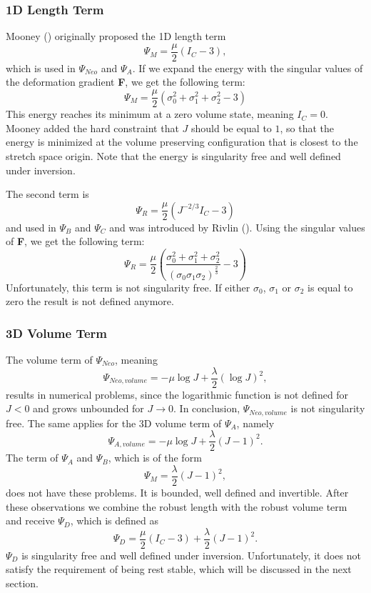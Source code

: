 \subsubsection{1D Length Term}
Mooney (\cite{mooney1940theory}) originally proposed the 1D length term 
\[
\Psi_{M}=\frac{\mu}{2}\left(I_{C}-3\right),
\]
which is used in $\Psi_{Neo}$ and $\Psi_{A}$. If we expand the energy with the singular values of the deformation gradient \textbf{F}, we get the following term:
\[
\Psi_{M}=\frac{\mu}{2}\left(\sigma_{0}^2 + \sigma_{1}^2 + \sigma_{2}^2 - 3\right)
\]
This energy reaches its minimum at a zero volume state, meaning $I_{C}=0$. Mooney added the hard constraint that $J$ should be equal to $1$, so that the energy is minimized at the volume preserving configuration that is closest to the stretch space origin. Note that the energy is singularity free and well defined under inversion.

The second term is
\[
\Psi_{R} = \frac{\mu}{2}\left(J^{-2 / 3} I_{C}-3\right)
\]
and used in $\Psi_{B}$ and $\Psi_{C}$ and was introduced by Rivlin (\cite{rivlin1948large}). Using the singular values of \textbf{F}, we get the following term:
\[
\Psi_{R} = \frac{\mu}{2}\left(\frac{\sigma_{0}^2 + \sigma_{1}^2 + \sigma_{2}^2}{(\sigma_{0}  \sigma_{1}  \sigma_{2})^\frac{2}{3}}
 - 3\right)
\]
Unfortunately, this term is not singularity free. If either $\sigma_{0}$, $\sigma_{1}$ or $\sigma_{2}$ is equal to zero the result is not defined anymore.

\subsubsection{3D Volume Term}
The volume term of $\Psi_{Neo}$, meaning
\[
\Psi_{Neo, volume} = -\mu \log J+\frac{\lambda}{2}(\log J)^{2},
\]
results in numerical problems, since the logarithmic function is not defined for $J<0$ and grows unbounded for $J \rightarrow 0$. In conclusion, $\Psi_{Neo, volume}$ is not singularity free. 
The same applies for the 3D volume term of $\Psi_{A}$, namely
\[
\Psi_{A, volume} = -\mu \log J+\frac{\lambda}{2}(J-1)^{2}.
\]
The term of $\Psi_{A}$ and $\Psi_{B}$, which is of the form
\[
\Psi_{M} = \frac{\lambda}{2}(J-1)^{2},
\]
does not have these problems. It is bounded, well defined and invertible. After these observations we combine the robust length with the robust volume term and receive $\Psi_D$, which is defined as
\[
\Psi_{D} = \frac{\mu}{2}\left(I_{C}-3\right) +\frac{\lambda}{2}(J-1)^{2}.
\]
$\Psi_{D}$ is singularity free and well defined under inversion. Unfortunately, it does not satisfy the requirement of being rest stable, which will be discussed in the next section.

